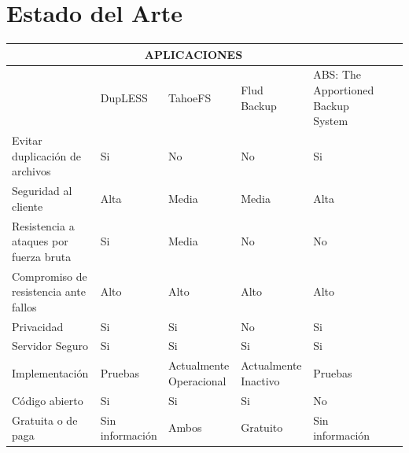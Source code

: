 \section{Estado del Arte}
\begin{tabular}{ |p{3cm}|p{2.5cm}|p{2.5cm}|p{2.5cm}|p{2.5cm}|p{2.5cm}|p{2.5cm}| }
\hline
\multicolumn{5}{|c|}{APLICACIONES}\\
\hline
{}  & {DupLESS } & {TahoeFS } & {Flud Backup} & {ABS: The Apportioned Backup System} \\
\hline
{ Evitar duplicación de archivos}  & {Si} & {No} & {No} & {Si}  \\
\hline
{Seguridad al cliente}  & {Alta} & {Media} & {Media} & {Alta}  \\
\hline
{Resistencia a ataques por fuerza bruta}  & {Si} & {Media} & { No} & {No}  \\
\hline
{Compromiso de resistencia ante fallos}  & {Alto} & {Alto} & {Alto} & {Alto}  \\
\hline
{Privacidad}  & {Si} & {Si}  & {No} & { Si }  \\
\hline
{Servidor Seguro}  & {Si} & {Si} & {Si } & {Si} \\
\hline
{Implementación }  & { Pruebas } & {Actualmente Operacional} & { Actualmente Inactivo } & {Pruebas }  \\
\hline
{Código abierto}  & {Si} & {Si} & {Si} & {No}  \\
\hline
{Gratuita o de paga}  & {Sin información} & {Ambos} & {Gratuito} & {Sin información} \\
\hline
\end{tabular}

